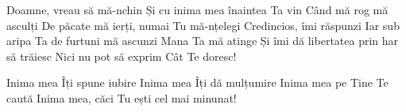 
\beginverse
Doamne, vreau să mă-nchin
Și cu inima mea înaintea Ta vin
Când mă rog mă asculți
De păcate mă ierți, numai Tu mă-nțelegi
Credincios, îmi răspunzi
Iar sub aripa Ta de furtuni mă ascunzi
Mana Ta mă atinge
Și îmi dă libertatea prin har să trăiesc
Nici nu pot să exprim
Cât Te doresc!
\endverse

\beginchorus
Inima mea Îți spune iubire
Inima mea Îți dă mulțumire
Inima mea pe Tine Te caută
Inima mea, căci Tu ești cel mai minunat!
\endchorus

\endsong